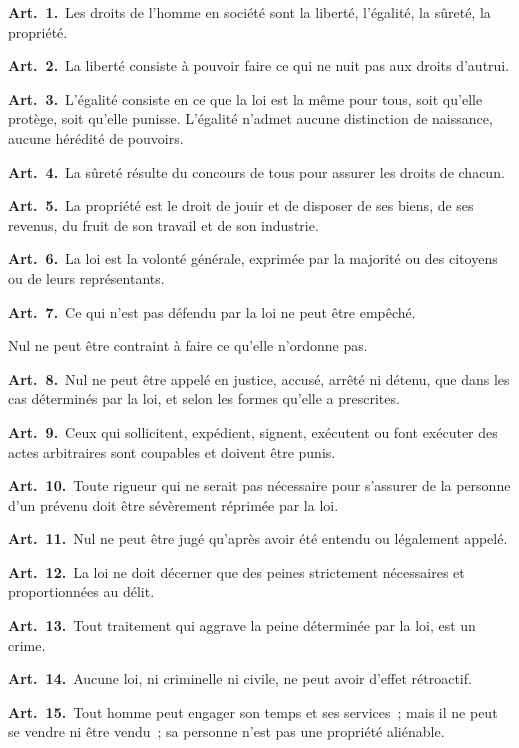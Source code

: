 \documentclass[french,twoside]{book} %
\newcommand{\labelchar}[1]{\textbf{\color{rubric} #1}}
\begin{document}
\labelchar{Art. 1.} Les droits de l’homme en société sont la liberté, l’égalité, la sûreté, la propriété.\par
\labelchar{Art. 2.} La liberté consiste à pouvoir faire ce qui ne nuit pas aux droits d’autrui.\par
\labelchar{Art. 3.} L’égalité consiste en ce que la loi est la même pour tous, soit qu’elle protège, soit qu’elle punisse. L’égalité n’admet aucune distinction de naissance, aucune hérédité de pouvoirs.\par
\labelchar{Art. 4.} La sûreté résulte du concours de tous pour assurer les droits de chacun.\par
\labelchar{Art. 5.} La propriété est le droit de jouir et de disposer de ses biens, de ses revenus, du fruit de son travail et de son industrie.\par
\labelchar{Art. 6.} La loi est la volonté générale, exprimée par la majorité ou des citoyens ou de leurs représentants.\par
\labelchar{Art. 7.} Ce qui n’est pas défendu par la loi ne peut être empêché.\par
Nul ne peut être contraint à faire ce qu’elle n’ordonne pas.\par
\labelchar{Art. 8.} Nul ne peut être appelé en justice, accusé, arrêté ni détenu, que dans les cas déterminés par la loi, et selon les formes qu’elle a prescrites.\par
\labelchar{Art. 9.} Ceux qui sollicitent, expédient, signent, exécutent ou font exécuter des actes arbitraires sont coupables et doivent être punis.\par
\labelchar{Art. 10.} Toute rigueur qui ne serait pas nécessaire pour s’assurer de la personne d’un prévenu doit être sévèrement réprimée par la loi.\par
\labelchar{Art. 11.} Nul ne peut être jugé qu’après avoir été entendu ou légalement appelé.\par
\labelchar{Art. 12.} La loi ne doit décerner que des peines strictement nécessaires et proportionnées au délit.\par
\labelchar{Art. 13.} Tout traitement qui aggrave la peine déterminée par la loi, est un crime.\par
\labelchar{Art. 14.} Aucune loi, ni criminelle ni civile, ne peut avoir d’effet rétroactif.\par
\labelchar{Art. 15.} Tout homme peut engager son temps et ses services ; mais il ne peut se vendre ni être vendu ; sa personne n’est pas une propriété aliénable.\par
\end{document}
